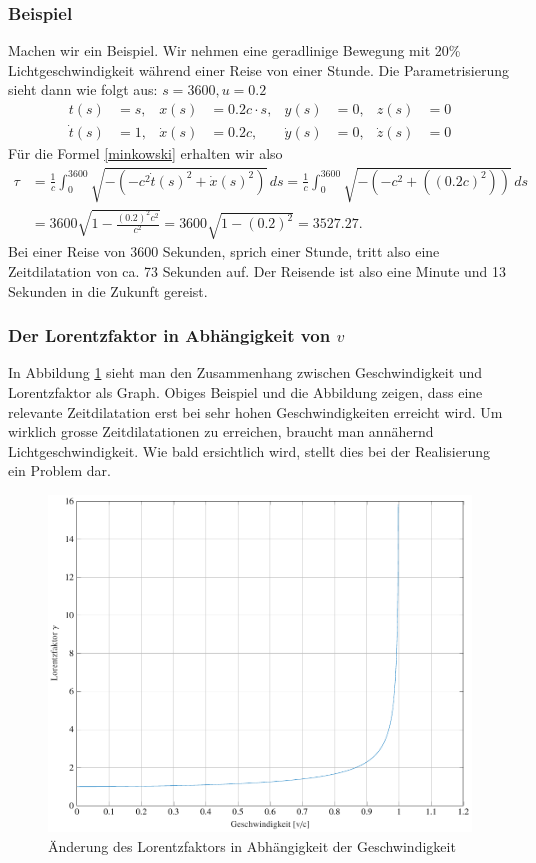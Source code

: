 \begin{refsection}
\subsubsection{Beispiel}
Machen wir ein Beispiel. Wir nehmen eine geradlinige Bewegung mit 20\% Lichtgeschwindigkeit während einer Reise von einer Stunde. Die Parametrisierung sieht dann wie folgt aus:
$s=3600, u=0.2$ 
\[
\begin{aligned}
t(s)&=s, & x(s)&=0.2c \cdot s, & y(s)&=0, & z(s)&=0 \\
\dot{t}(s)&=1, & \dot{x}(s)&=0.2c, & \dot{y}(s)&=0, & \dot{z}(s)&=0
\end{aligned}
\]
Für die Formel \eqref{minkowski} erhalten wir also
\begin{align*}
 \tau
&=
\frac{1}{c}\int_{0}^{3600}\sqrt{-(-c^2\dot{t}(s)^2+\dot{x}(s)^2)}\,ds
=
\frac{1}{c}\int_{0}^{3600}\sqrt{-(-c^2+((0.2c)^2))}\,ds\\
&=
3600\sqrt{1-\frac{(0.2)^2 c^2}{c^2}} 
=
3600\sqrt{1-(0.2)^2}
=
3527.27.
\end{align*}
Bei einer Reise von 3600 Sekunden, sprich einer Stunde, tritt also eine Zeitdilatation von ca. 73 Sekunden auf. Der Reisende ist also eine Minute und 13 Sekunden in die Zukunft gereist.

\subsubsection{Der Lorentzfaktor in Abhängigkeit von $v$}
In Abbildung \ref{skript:zeitreisen:fig:lorentz} sieht man den Zusammenhang zwischen Geschwindigkeit und Lorentzfaktor als Graph. Obiges Beispiel und die Abbildung zeigen, dass eine relevante Zeitdilatation erst bei sehr hohen Geschwindigkeiten erreicht wird. Um wirklich grosse Zeitdilatationen zu erreichen, braucht man annähernd Lichtgeschwindigkeit. Wie bald ersichtlich wird, stellt dies bei der Realisierung ein Problem dar.
\begin{figure}[H]
   \centering
   \includegraphics[width=12cm]{zeitreisen/tikz/lorentz.pdf}
   \caption{Änderung des Lorentzfaktors in Abhängigkeit der Geschwindigkeit}
   \label{skript:zeitreisen:fig:lorentz} 
\end{figure}

\end{refsection}
